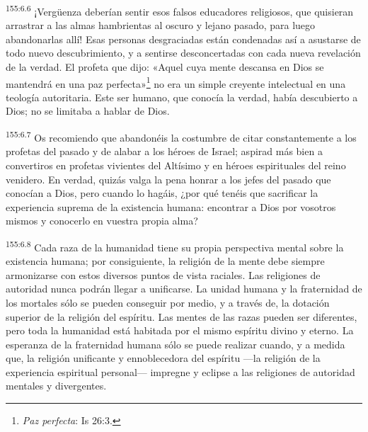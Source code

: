 \par 
\textsuperscript{155:6.6} ¡Vergüenza deberían sentir esos falsos educadores religiosos, que quisieran arrastrar a las almas hambrientas al oscuro y lejano pasado, para luego abandonarlas allí! Esas personas desgraciadas están condenadas así a asustarse de todo nuevo descubrimiento, y a sentirse desconcertadas con cada nueva revelación de la verdad. El profeta que dijo: «Aquel cuya mente descansa en Dios se mantendrá en una paz perfecta»\footnote{\textit{Paz perfecta}: Is 26:3.} no era un simple creyente intelectual en una teología autoritaria. Este ser humano, que conocía la verdad, había descubierto a Dios; no se limitaba a hablar de Dios.

\par 
\textsuperscript{155:6.7} Os recomiendo que abandonéis la costumbre de citar constantemente a los profetas del pasado y de alabar a los héroes de Israel; aspirad más bien a convertiros en profetas vivientes del Altísimo y en héroes espirituales del reino venidero. En verdad, quizás valga la pena honrar a los jefes del pasado que conocían a Dios, pero cuando lo hagáis, ¿por qué tenéis que sacrificar la experiencia suprema de la existencia humana: encontrar a Dios por vosotros mismos y conocerlo en vuestra propia alma?

\par 
\textsuperscript{155:6.8} Cada raza de la humanidad tiene su propia perspectiva mental sobre la existencia humana; por consiguiente, la religión de la mente debe siempre armonizarse con estos diversos puntos de vista raciales. Las religiones de autoridad nunca podrán llegar a unificarse. La unidad humana y la fraternidad de los mortales sólo se pueden conseguir por medio, y a través de, la dotación superior de la religión del espíritu. Las mentes de las razas pueden ser diferentes, pero toda la humanidad está habitada por el mismo espíritu divino y eterno. La esperanza de la fraternidad humana sólo se puede realizar cuando, y a medida que, la religión unificante y ennoblecedora del espíritu ---la religión de la experiencia espiritual personal--- impregne y eclipse a las religiones de autoridad mentales y divergentes.

